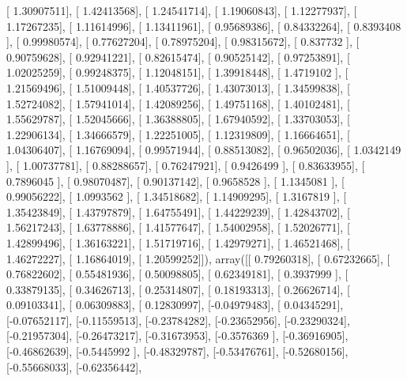 \documentclass{article}
\begin{document}
       [ 1.30907511],
       [ 1.42413568],
       [ 1.24541714],
       [ 1.19060843],
       [ 1.12277937],
       [ 1.17267235],
       [ 1.11614996],
       [ 1.13411961],
       [ 0.95689386],
       [ 0.84332264],
       [ 0.8393408 ],
       [ 0.99980574],
       [ 0.77627204],
       [ 0.78975204],
       [ 0.98315672],
       [ 0.837732  ],
       [ 0.90759628],
       [ 0.92941221],
       [ 0.82615474],
       [ 0.90525142],
       [ 0.97253891],
       [ 1.02025259],
       [ 0.99248375],
       [ 1.12048151],
       [ 1.39918448],
       [ 1.4719102 ],
       [ 1.21569496],
       [ 1.51009448],
       [ 1.40537726],
       [ 1.43073013],
       [ 1.34599838],
       [ 1.52724082],
       [ 1.57941014],
       [ 1.42089256],
       [ 1.49751168],
       [ 1.40102481],
       [ 1.55629787],
       [ 1.52045666],
       [ 1.36388805],
       [ 1.67940592],
       [ 1.33703053],
       [ 1.22906134],
       [ 1.34666579],
       [ 1.22251005],
       [ 1.12319809],
       [ 1.16664651],
       [ 1.04306407],
       [ 1.16769094],
       [ 0.99571944],
       [ 0.88513082],
       [ 0.96502036],
       [ 1.0342149 ],
       [ 1.00737781],
       [ 0.88288657],
       [ 0.76247921],
       [ 0.9426499 ],
       [ 0.83633955],
       [ 0.7896045 ],
       [ 0.98070487],
       [ 0.90137142],
       [ 0.9658528 ],
       [ 1.1345081 ],
       [ 0.99056222],
       [ 1.0993562 ],
       [ 1.34518682],
       [ 1.14909295],
       [ 1.3167819 ],
       [ 1.35423849],
       [ 1.43797879],
       [ 1.64755491],
       [ 1.44229239],
       [ 1.42843702],
       [ 1.56217243],
       [ 1.63778886],
       [ 1.41577647],
       [ 1.54002958],
       [ 1.52026771],
       [ 1.42899496],
       [ 1.36163221],
       [ 1.51719716],
       [ 1.42979271],
       [ 1.46521468],
       [ 1.46272227],
       [ 1.16864019],
       [ 1.20599252]]), array([[ 0.79260318],
       [ 0.67232665],
       [ 0.76822602],
       [ 0.55481936],
       [ 0.50098805],
       [ 0.62349181],
       [ 0.3937999 ],
       [ 0.33879135],
       [ 0.34626713],
       [ 0.25314807],
       [ 0.18193313],
       [ 0.26626714],
       [ 0.09103341],
       [ 0.06309883],
       [ 0.12830997],
       [-0.04979483],
       [ 0.04345291],
       [-0.07652117],
       [-0.11559513],
       [-0.23784282],
       [-0.23652956],
       [-0.23290324],
       [-0.21957304],
       [-0.26473217],
       [-0.31673953],
       [-0.3576369 ],
       [-0.36916905],
       [-0.46862639],
       [-0.5445992 ],
       [-0.48329787],
       [-0.53476761],
       [-0.52680156],
       [-0.55668033],
       [-0.62356442],
\end{document}
